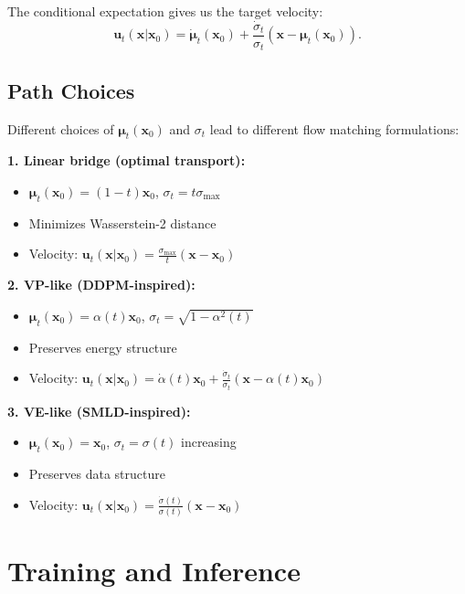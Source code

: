The conditional expectation gives us the target velocity:
\begin{equation}
    \mathbf{u}_t(\mathbf{x}|\mathbf{x}_0) = \dot{\boldsymbol{\mu}}_t(\mathbf{x}_0) + \frac{\dot{\sigma}_t}{\sigma_t}(\mathbf{x} - \boldsymbol{\mu}_t(\mathbf{x}_0)).
\end{equation}

\subsection{Path Choices}

Different choices of $\boldsymbol{\mu}_t(\mathbf{x}_0)$ and $\sigma_t$ lead to different flow matching formulations:

\textbf{1. Linear bridge (optimal transport):}
\begin{itemize}
    \item $\boldsymbol{\mu}_t(\mathbf{x}_0) = (1-t)\mathbf{x}_0$, $\sigma_t = t\sigma_{\max}$
    \item Minimizes Wasserstein-2 distance
    \item Velocity: $\mathbf{u}_t(\mathbf{x}|\mathbf{x}_0) = \frac{\sigma_{\max}}{t}(\mathbf{x} - \mathbf{x}_0)$
\end{itemize}

\textbf{2. VP-like (DDPM-inspired):}
\begin{itemize}
    \item $\boldsymbol{\mu}_t(\mathbf{x}_0) = \alpha(t)\mathbf{x}_0$, $\sigma_t = \sqrt{1-\alpha^2(t)}$
    \item Preserves energy structure
    \item Velocity: $\mathbf{u}_t(\mathbf{x}|\mathbf{x}_0) = \dot{\alpha}(t)\mathbf{x}_0 + \frac{\dot{\sigma}_t}{\sigma_t}(\mathbf{x} - \alpha(t)\mathbf{x}_0)$
\end{itemize}

\textbf{3. VE-like (SMLD-inspired):}
\begin{itemize}
    \item $\boldsymbol{\mu}_t(\mathbf{x}_0) = \mathbf{x}_0$, $\sigma_t = \sigma(t)$ increasing
    \item Preserves data structure
    \item Velocity: $\mathbf{u}_t(\mathbf{x}|\mathbf{x}_0) = \frac{\dot{\sigma}(t)}{\sigma(t)}(\mathbf{x} - \mathbf{x}_0)$
\end{itemize}

\section{Training and Inference}

